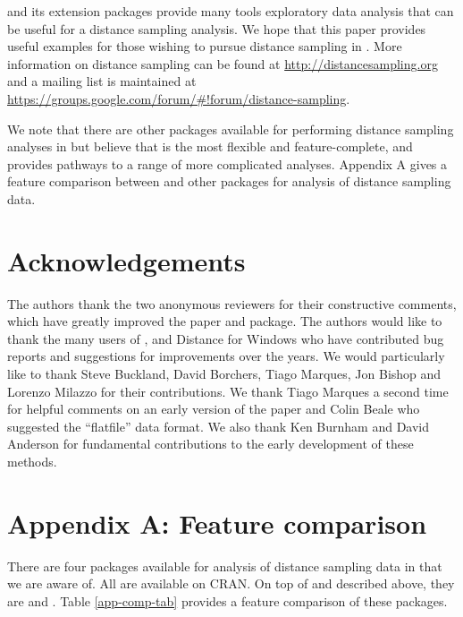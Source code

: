 \documentclass[article]{jss}\usepackage[]{graphicx}\usepackage[]{color}
\begin{document}
 and its extension packages provide many tools exploratory data analysis that can be useful for a distance sampling analysis. We hope that this paper provides useful examples for those wishing to pursue distance sampling in . More information on distance sampling can be found at \url{http://distancesampling.org} and a mailing list is maintained at \url{https://groups.google.com/forum/#!forum/distance-sampling}.

We note that there are other packages available for performing distance sampling analyses in  but believe that  is the most flexible and feature-complete, and provides pathways to a range of more complicated analyses. Appendix A gives a feature comparison between  and other  packages for analysis of distance sampling data.


\section{Acknowledgements}

The authors thank the two anonymous reviewers for their constructive comments, which have greatly improved the paper and package. The authors would like to thank the many users of ,  and Distance for Windows who have contributed bug reports and suggestions for improvements over the years. We would particularly like to thank Steve Buckland, David Borchers, Tiago Marques, Jon Bishop and Lorenzo Milazzo for their contributions. We thank Tiago Marques a second time for helpful comments on an early version of the paper and Colin Beale who suggested the ``flatfile'' data format. We also thank Ken Burnham and David Anderson for fundamental contributions to the early development of these methods.


\appendix

\section*{Appendix A: Feature comparison}

There are four packages available for analysis of distance sampling data in  that we are aware of. All are available on CRAN. On top of  and  \citep{mrds-pkg} described above, they are  \citep{Rdistance-pkg} and  \citep{Fiske:2011gv}. Table \ref{app-comp-tab} provides a feature comparison of these packages.
\end{document}
